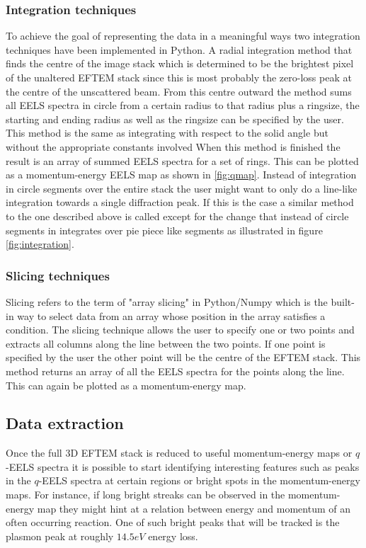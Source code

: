 \subsubsection{Integration techniques}
To achieve the goal of representing the data in a meaningful ways two integration techniques have been implemented in Python.
A radial integration method that finds the centre of the image stack which is determined to be the brightest pixel of the unaltered EFTEM stack since this is most probably the zero-loss peak at the centre of the unscattered beam.
From this centre outward the method sums all EELS spectra in circle from a certain radius to that radius plus a ringsize, the starting and ending radius as well as the ringsize can be specified by the user.
This method is the same as integrating with respect to the solid angle but without the appropriate constants involved
When this method is finished the result is an array of summed EELS spectra for a set of rings. This can be plotted as a momentum-energy EELS map as shown in \ref{fig:qmap}.
Instead of integration in circle segments over the entire stack the user might want to only do a line-like integration towards a single diffraction peak. If this is the case a similar method to the one described above is called except for the change that instead of circle segments in integrates over pie piece like segments as illustrated in figure \ref{fig:integration}.


\subsubsection{Slicing techniques}
Slicing refers to the term of "array slicing" in Python/Numpy which is the built-in way to select data from an array whose position in the array satisfies a condition. The slicing technique allows the user to specify one or two points and extracts all columns along the line between the two points. If one point is specified by the user the other point will be the centre of the EFTEM stack. This method returns an array of all the EELS spectra for the points along the line. This can again be plotted as a momentum-energy map.

\subsection{Data extraction}
Once the full 3D EFTEM stack is reduced to useful momentum-energy maps or $q$-EELS spectra it is possible to start identifying interesting features such as peaks in the $q$-EELS spectra at certain regions or bright spots in the momentum-energy maps. For instance, if long bright streaks can be observed in the momentum-energy map they might hint at a relation between energy and momentum of an often occurring reaction. One of such bright peaks that will be tracked is the plasmon peak at roughly $14.5eV$ energy loss.


